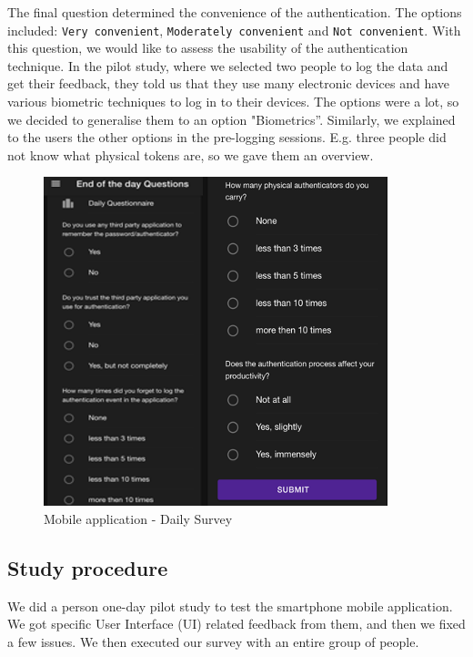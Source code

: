 The final question determined the convenience of the authentication. The options included: \texttt{Very convenient}, \texttt{Moderately convenient} and \texttt{Not convenient}. With this question, we would like to assess the usability of the authentication technique. In the pilot study, where we selected two people to log the data and get their feedback, they told us that they use many electronic devices and have various biometric techniques to log in to their devices. The options were a lot, so we decided to generalise them to an option "Biometrics''. Similarly, we explained to the users the other options in the pre-logging sessions. E.g. three people did not know what physical tokens are, so we gave them an overview. 
\begin{figure}
\begin{center}
  \includegraphics[scale=0.5]{images/eod-survey.png}
\end{center}
\caption{\label{fig:app-daily-survey} Mobile application - Daily Survey}
\end{figure}
\subsection{Study procedure}
We did a person one-day pilot study to test the smartphone mobile application. We got specific User Interface (UI) related feedback from them, and then we fixed a few issues. We then executed our survey with an entire group of people.
